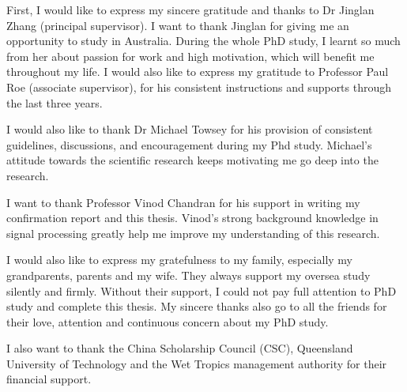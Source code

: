 \begin{ack}
First, I would like to express my sincere gratitude and thanks to Dr Jinglan Zhang (principal supervisor). I want to thank Jinglan for giving me an opportunity to study in Australia. During the whole PhD study, I learnt so much from her about passion for work and high motivation, which will benefit me throughout my life. 
I would also like to express my gratitude to Professor Paul Roe (associate supervisor), for his consistent instructions and supports through the last three years.  

I would also like to thank Dr Michael Towsey for his provision of consistent guidelines, discussions, and encouragement during my Phd study. Michael's attitude towards the scientific research keeps motivating me go deep into the research.  


I want to thank Professor Vinod Chandran for his support in writing my confirmation report and this thesis. Vinod's strong background knowledge in signal processing greatly help me improve my understanding of this research.

I would also like to express my gratefulness to my family, especially my grandparents, parents and my wife. They always support my oversea study silently and firmly. Without their support, I could not pay full attention to PhD study and complete this thesis. 
My sincere thanks also go to all the friends for their love, attention and continuous concern about my PhD study. 

I also want to thank the China Scholarship Council (CSC), Queensland University of Technology and the Wet Tropics management authority for their financial support. 

\end{ack}





\afterpreface
